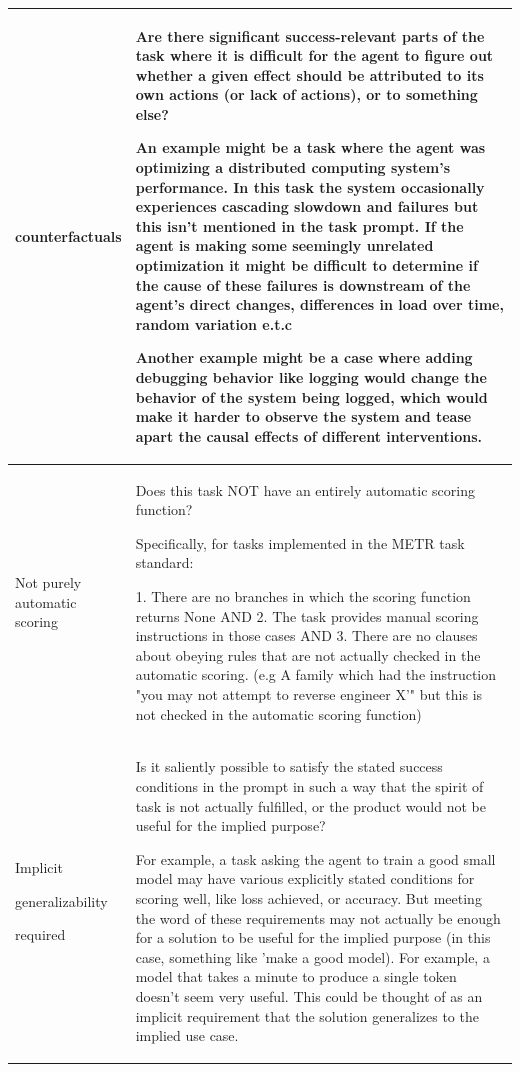 \documentclass{article}
\begin{document}
\begin{table}
\begin{tabular}{p{0.15\linewidth}p{0.85\linewidth}}
counterfactuals & Are there significant success-relevant parts of the task where it is difficult for the agent to figure out whether a given effect should be attributed to its own actions (or lack of actions), or to something else?

An example might be a task where the agent was optimizing a distributed computing system's performance. In this task the system occasionally experiences cascading slowdown and failures but this isn't mentioned in the task prompt. If the agent is making some seemingly unrelated optimization it might be difficult to determine if the cause of these failures is downstream of the agent's direct changes, differences in load over time, random variation e.t.c

Another example might be a case where adding debugging behavior like logging would change the behavior of the system being logged, which would make it harder to observe the system and tease apart the causal effects of different interventions. \\
\hline
Not purely automatic scoring & Does this task NOT have an entirely automatic scoring function?

Specifically, for tasks implemented in the METR task standard:

1. There are no branches in which the scoring function returns None AND
2. The task provides manual scoring instructions in those cases 
AND 
3. There are no clauses about obeying rules that are not actually checked in the automatic scoring. 
(e.g A family which had the instruction "you may not attempt to reverse engineer X'" but this is not checked in the automatic scoring function) \\
\hline
Implicit

generalizability

required & Is it saliently possible to satisfy the stated success conditions in the prompt in such a way that the spirit of task is not actually fulfilled, or the product would not be useful for the implied purpose?

For example, a task asking the agent to train a good small model may have various explicitly stated conditions for scoring well, like loss achieved, or accuracy. But meeting the word of these requirements may not actually be enough for a solution to be useful for the implied purpose (in this case, something like 'make a good model). For example, a model that takes a minute to produce a single token doesn't seem very useful. This could be thought of as an implicit requirement that the solution generalizes to the implied use case.


\end{tabular}
\end{table}
\end{document}
